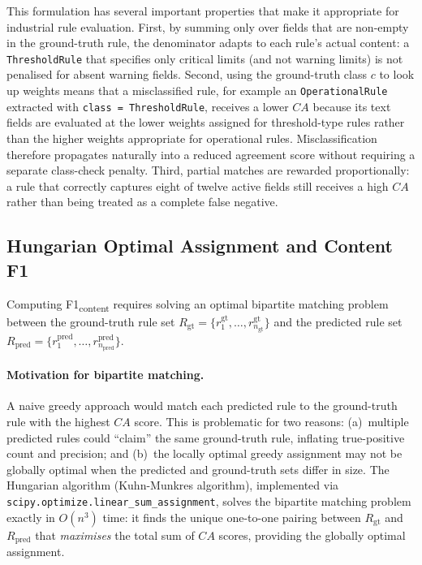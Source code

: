 ﻿\documentclass[11pt]{article}
\begin{document}
This formulation has several important properties that make it appropriate for
industrial rule evaluation.
First, by summing only over fields that are non-empty in the ground-truth rule,
the denominator adapts to each rule's actual content: a \texttt{ThresholdRule}
that specifies only critical limits (and not warning limits) is not penalised
for absent warning fields.
Second, using the ground-truth class $c$ to look up weights means that a
misclassified rule, for example an \texttt{OperationalRule} extracted with
\texttt{class = ThresholdRule}, receives a lower $CA$ because its text fields
are evaluated at the lower weights assigned for threshold-type rules rather than
the higher weights appropriate for operational rules.
Misclassification therefore propagates naturally into a reduced agreement score
without requiring a separate class-check penalty.
Third, partial matches are rewarded proportionally: a rule that correctly
captures eight of twelve active fields still receives a high $CA$ rather than
being treated as a complete false negative.

\subsection{Hungarian Optimal Assignment and Content F1}
\label{sec:hungarian}

Computing F1\textsubscript{content} requires solving an optimal bipartite
matching problem between the ground-truth rule set
$R_{\text{gt}} = \{r^{\text{gt}}_1, \ldots, r^{\text{gt}}_{n_{\text{gt}}}\}$
and the predicted rule set
$R_{\text{pred}} = \{r^{\text{pred}}_1, \ldots, r^{\text{pred}}_{n_{\text{pred}}}\}$.

\paragraph{Motivation for bipartite matching.}
A naive greedy approach would match each predicted rule to the ground-truth rule
with the highest $CA$ score.
This is problematic for two reasons: (a)~multiple predicted rules could
``claim'' the same ground-truth rule, inflating true-positive count and
precision; and (b)~the locally optimal greedy assignment may not be globally
optimal when the predicted and ground-truth sets differ in size.
The Hungarian algorithm (Kuhn-Munkres algorithm), implemented via
\texttt{scipy.optimize.linear\_sum\_assignment}, solves the bipartite matching
problem exactly in $O(n^3)$ time: it finds the unique one-to-one pairing between
$R_{\text{gt}}$ and $R_{\text{pred}}$ that \emph{maximises} the total sum of
$CA$ scores, providing the globally optimal assignment.
\end{document}
